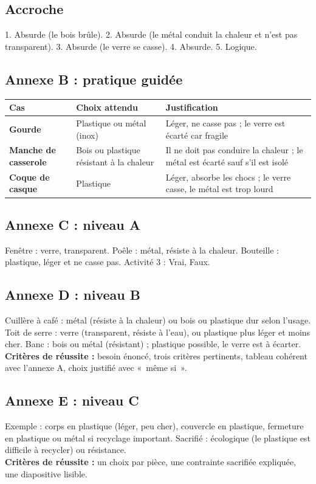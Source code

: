 \documentclass[11pt,a4paper]{article}
\begin{document}
\subsection*{Accroche}
1. Absurde (le bois brûle). 2. Absurde (le métal conduit la chaleur et n'est pas transparent). 3. Absurde (le verre se casse). 4. Absurde. 5. Logique.

\subsection*{Annexe B : pratique guidée}
\begin{tabularx}{\linewidth}{>{\bfseries}p{3cm}Y Y}
\toprule
Cas & Choix attendu & Justification\\
\midrule
Gourde & Plastique ou métal (inox) & Léger, ne casse pas ; le verre est écarté car fragile\\
Manche de casserole & Bois ou plastique résistant à la chaleur & Il ne doit pas conduire la chaleur ; le métal est écarté sauf s'il est isolé\\
Coque de casque & Plastique & Léger, absorbe les chocs ; le verre casse, le métal est trop lourd\\
\bottomrule
\end{tabularx}

\subsection*{Annexe C : niveau A}
Fenêtre : verre, transparent. Poêle : métal, résiste à la chaleur. Bouteille : plastique, léger et ne casse pas. Activité 3 : Vrai, Faux.

\subsection*{Annexe D : niveau B}
Cuillère à café : métal (résiste à la chaleur) ou bois ou plastique dur selon l'usage. Toit de serre : verre (transparent, résiste à l'eau), ou plastique plus léger et moins cher. Banc : bois ou métal (résistant) ; plastique possible, le verre est à écarter.\\
\textbf{Critères de réussite :} besoin énoncé, trois critères pertinents, tableau cohérent avec l'annexe A, choix justifié avec «~même si~».

\subsection*{Annexe E : niveau C}
Exemple : corps en plastique (léger, peu cher), couvercle en plastique, fermeture en plastique ou métal si recyclage important. Sacrifié : écologique (le plastique est difficile à recycler) ou résistance.\\
\textbf{Critères de réussite :} un choix par pièce, une contrainte sacrifiée expliquée, une diapositive lisible.
\end{document}
